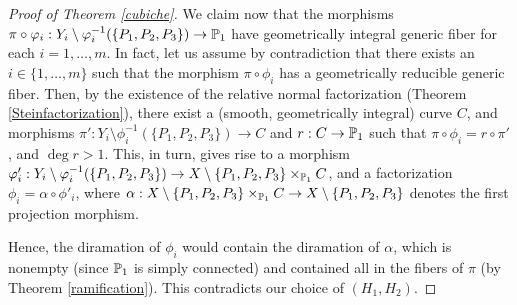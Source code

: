 \documentclass[a4paper,12pt]{article}
\begin{document}
\begin{proof}[Proof of Theorem \ref{cubiche}]
	
	We claim now that the morphisms $\pi \circ \phi_i:Y_i \setminus \phi_i^{-1}(\{P_1,P_2,P_3\}) \rightarrow \P_1$ have geometrically integral generic fiber for each $i=1, \dots, m$. In fact, let us assume by contradiction that there exists an $i \in \{1, \dots, m\}$ such that the morphism $\pi \circ \phi_i$ has a geometrically reducible generic fiber. Then, by the existence of the relative normal factorization (Theorem \ref{Steinfactorization}), there exist a (smooth, geometrically integral) curve $C$, and morphisms $\pi':Y_i \setminus \phi_i^{-1}(\{P_1,P_2,P_3\}) \rightarrow C$ and $r:C \rightarrow \P_1$ such that $\pi \circ \phi_i =r \circ \pi'$, and $\deg r >1$. This, in turn, gives rise to a morphism $\phi'_i:Y_i \setminus \phi_i^{-1}(\{P_1,P_2,P_3\}) \rightarrow X \setminus \{P_1,P_2,P_3\}\times_{\P_1}C$, and a factorization $\phi_i=\alpha \circ \phi'_i$, where $\alpha: X \setminus \{P_1,P_2,P_3\}\times_{\P_1}C \rightarrow  X \setminus \{P_1,P_2,P_3\}$ denotes the first projection morphism.
	
	Hence, the diramation of $\phi_i$ would contain the diramation of $\alpha$, which is nonempty (since $\P_1$ is simply connected) and contained all in the fibers of $\pi$ (by Theorem \ref{ramification}). This contradicts our choice of $(H_1,H_2)$.
	


\end{proof}
\end{document}
